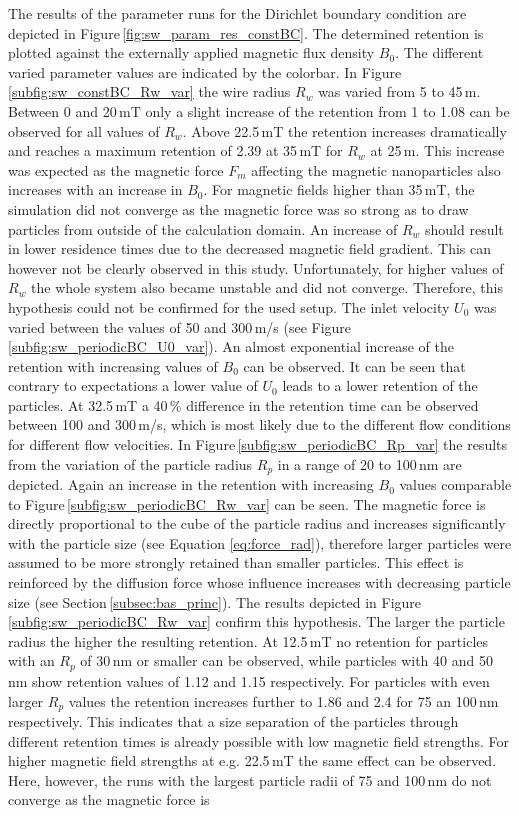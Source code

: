 The results of the parameter runs for the Dirichlet boundary condition are depicted in Figure\,\ref{fig:sw_param_res_constBC}. The determined retention is plotted against the externally applied magnetic flux density $B_{0}$. The different varied parameter values are indicated by the colorbar. In Figure\, \ref{subfig:sw_constBC_Rw_var} the wire radius $R_{w}$ was varied from 5 to 45\,\textmu m. Between 0 and 20\,mT only a slight increase of the retention from 1 to 1.08 can be observed for all values of $R_{w}$. Above 22.5\,mT the retention increases dramatically and reaches a maximum retention of 2.39 at 35\,mT for $R_{w}$ at 25\,\textmu m. This increase was expected as the magnetic force $F_{m}$    
affecting the magnetic nanoparticles also increases with an increase in $B_{0}$. For magnetic fields higher than 35\,mT, the simulation did not converge as the magnetic force was so strong as to draw particles from outside of the calculation domain. An increase of $R_{w}$ should result in lower residence times due to the decreased magnetic field gradient. This can however not be clearly observed in this study. Unfortunately, for higher values of $R_{w}$ the whole system also became unstable and did not converge. Therefore, this hypothesis could not be confirmed for the used setup. The inlet velocity $U_{0}$ was varied between the values of 50 and 300\,\textmu m/s (see Figure\,\ref{subfig:sw_periodicBC_U0_var}). An almost exponential increase of the retention with increasing values of $B_{0}$ can be observed. It can be seen that contrary to expectations a lower value of $U_{0}$ leads to a lower retention of the particles. At 32.5\,mT a 40\,\% difference in the retention time can be observed between 100 and 300\,\textmu m/s, which is most likely due to the different flow conditions for different flow velocities. In Figure\,\ref{subfig:sw_periodicBC_Rp_var} the results from the variation of the particle radius $R_{p}$ in a range of 20 to 100\,nm are depicted. Again an increase in the retention with increasing $B_{0}$ values comparable to Figure\,\ref{subfig:sw_periodicBC_Rw_var} can be seen. The magnetic force is directly proportional to the cube of the particle radius and increases significantly with the particle size (see Equation \ref{eq:force_rad}), therefore larger particles were assumed to be more strongly retained than smaller particles. This effect is reinforced by the diffusion force whose influence increases with decreasing particle size (see Section\,\ref{subsec:bas_princ}). The results depicted in Figure \ref{subfig:sw_periodicBC_Rw_var} confirm this hypothesis. The larger the particle radius the higher the resulting retention. At 12.5\,mT no retention for particles with an $R_{p}$ of 30\,nm or smaller can be observed, while particles with 40 and 50\,nm show retention values of 1.12 and 1.15 respectively. For particles with even larger $R_{p}$ values the retention increases further to 1.86 and 2.4 for 75 an 100\,nm respectively. This indicates that a size separation of the particles through different retention times is already possible with low magnetic field strengths. For higher magnetic field strengths at e.g. 22.5\,mT the same effect can be observed. Here, however, the runs with the largest particle radii of 75 and 100\,nm do not converge as the magnetic force is 